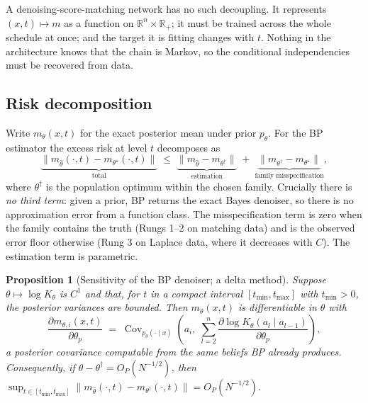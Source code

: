 \documentclass[11pt]{article}
\newtheorem{proposition}{Proposition}
\theoremstyle{remark}
\newcommand{\R}{\mathbb{R}}
\newcommand{\Cov}{\operatorname{Cov}}
\begin{document}
A denoising-score-matching network has no such decoupling. It represents
$(x,t) \mapsto m$ as a function on $\R^n \times \R_+$; it must be trained across
the whole schedule at once; and the target it is fitting changes with $t$.
Nothing in the architecture knows that the chain is Markov, so the conditional
independencies must be recovered from data.

\subsection{Risk decomposition}

Write $m_\theta(x,t)$ for the exact posterior mean under prior $p_\theta$. For
the BP estimator the excess risk at level $t$ decomposes as
\begin{equation}
  \underbrace{\bigl\| m_{\hat\theta}(\cdot,t) - m_{\theta^\star}(\cdot,t)\bigr\|}_{\text{total}}
  \;\le\;
  \underbrace{\bigl\| m_{\hat\theta} - m_{\theta^\dagger}\bigr\|}_{\text{estimation}}
  \;+\;
  \underbrace{\bigl\| m_{\theta^\dagger} - m_{\theta^\star}\bigr\|}_{\text{family misspecification}},
  \label{eq:risk}
\end{equation}
where $\theta^\dagger$ is the population optimum within the chosen family.
Crucially there is \emph{no third term}: given a prior, BP returns the exact
Bayes denoiser, so there is no approximation error from a function class. The
misspecification term is zero when the family contains the truth (Rungs 1--2 on
matching data) and is the observed error floor otherwise (Rung 3 on Laplace
data, where it decreases with $C$). The estimation term is parametric.

\begin{proposition}[Sensitivity of the BP denoiser; a delta method]
\label{prop:sensitivity}
Suppose $\theta \mapsto \log K_\theta$ is $C^1$ and that, for
$t$ in a compact interval $[t_{\min}, t_{\max}]$ with $t_{\min} > 0$, the
posterior variances are bounded. Then $m_\theta(x,t)$ is differentiable in
$\theta$ with
\begin{equation}
  \frac{\partial m_{\theta,i}(x,t)}{\partial \theta_p}
  \;=\;
  \Cov_{p_\theta(\cdot\mid x)}\!\left(
     a_i,\;
     \sum_{l=2}^{n} \frac{\partial \log K_\theta(a_l \mid a_{l-1})}{\partial \theta_p}
  \right),
  \label{eq:sensitivity}
\end{equation}
a posterior covariance computable from the same beliefs BP already produces.
Consequently, if $\hat\theta - \theta^\dagger = O_P(N^{-1/2})$, then
$\sup_{t \in [t_{\min},t_{\max}]}
   \|m_{\hat\theta}(\cdot,t) - m_{\theta^\dagger}(\cdot,t)\| = O_P(N^{-1/2})$.
\end{proposition}
\end{document}
